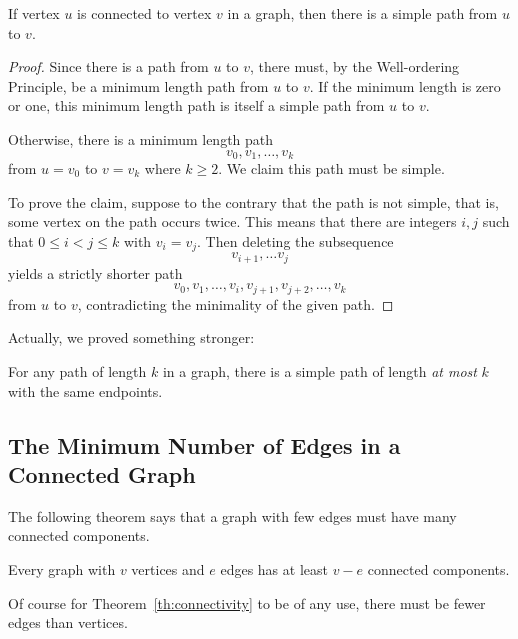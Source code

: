 \begin{lemma}\label{simplepath}
If vertex $u$ is connected to vertex $v$ in a graph, then there is a
simple path from $u$ to $v$.
\end{lemma}

\begin{proof}
Since there is a path from $u$ to $v$, there must, by the Well-ordering
Principle, be a minimum length path from $u$ to $v$.  If the minimum
length is zero or one, this minimum length path is itself a simple path
from $u$ to $v$.

Otherwise, there is a minimum length path
\[
v_0, v_1,\dots, v_k
\]
from $u = v_0$ to $v = v_k$ where $k \geq 2$.  We claim this path must be
simple.

To prove the claim, suppose to the contrary that the path is not simple,
that is, some vertex on the path occurs twice.  This means that there are
integers $i,j$ such that $0 \leq i < j \leq k$ with $v_i= v_j$.  Then
deleting the subsequence
\[
v_{i+1}, \dots v_j
\]
yields a strictly shorter path
\[
v_0, v_1,\dots, v_i,v_{j+1},v_{j+2},\dots, v_k
\]
from $u$ to $v$, contradicting the minimality of the given path.
\end{proof}

Actually, we proved something stronger:
\begin{corollary}\label{ss}
For any path of length $k$ in a graph, there is a simple path of length
\emph{at most} $k$ with the same endpoints.
\end{corollary}

\subsection{The Minimum Number of Edges in a Connected Graph}

The following theorem says that a graph with few edges must have many
connected components.

\begin{theorem} \label{th:connectivity}
Every graph with $v$ vertices and $e$ edges has at least $v - e$ connected
components.
\end{theorem}

Of course for Theorem~\ref{th:connectivity} to be of any use, there must
be fewer edges than vertices.

